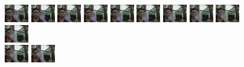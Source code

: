 \documentclass[12pt]{article}
\begin{document}
\noindent\begin{figure}[H]
\centering
\includegraphics[width=40px, height=30px]{../data/analysis/img0000.jpg}
\includegraphics[width=40px, height=30px]{../data/analysis/img0001.jpg}
\includegraphics[width=40px, height=30px]{../data/analysis/img0002.jpg}
\includegraphics[width=40px, height=30px]{../data/analysis/img0003.jpg}
\includegraphics[width=40px, height=30px]{../data/analysis/img0004.jpg}
\includegraphics[width=40px, height=30px]{../data/analysis/img0005.jpg}
\includegraphics[width=40px, height=30px]{../data/analysis/img0006.jpg}
\includegraphics[width=40px, height=30px]{../data/analysis/img0007.jpg}
\includegraphics[width=40px, height=30px]{../data/analysis/img0008.jpg}
\includegraphics[width=40px, height=30px]{../data/analysis/img0009.jpg} \\
\includegraphics[width=40px, height=30px]{../data/analysis/img0010.jpg}
\includegraphics[width=40px, height=30px]{../data/analysis/img0011.jpg}

\end{figure}
\end{document}
